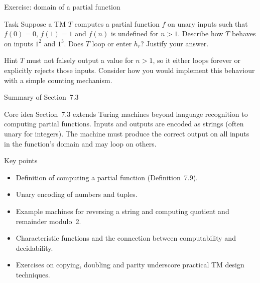 \begin{frame}[t]{Exercise: domain of a partial function}
  \begin{tblock}{Task}
    Suppose a TM $T$ computes a partial function $f$ on unary inputs
    such that $f(0)=0$, $f(1)=1$ and $f(n)$ is undefined for $n>1$.
    Describe how $T$ behaves on inputs $1^2$ and $1^3$.  Does $T$ loop
    or enter $h_r$?  Justify your answer.
  \end{tblock}
  \begin{talert}{Hint}
    $T$ must not falsely output a value for $n>1$, so it either loops
    forever or explicitly rejects those inputs.  Consider how you
    would implement this behaviour with a simple counting mechanism.
  \end{talert}
  \label{fr:7.3-14}
\end{frame}

\begin{frame}[t]{Summary of Section 7.3}
  \begin{tblock}{Core idea}
    Section 7.3 extends Turing machines beyond language recognition to
    computing partial functions.  Inputs and outputs are encoded as
    strings (often unary for integers).  The machine must produce the
    correct output on all inputs in the function’s domain and may
    loop on others.
  \end{tblock}
  \begin{tblock}{Key points}
    \begin{itemize}
      \item Definition of computing a partial function (Definition 7.9).
      \item Unary encoding of numbers and tuples.
      \item Example machines for reversing a string and computing
        quotient and remainder modulo 2.
      \item Characteristic functions and the connection between
        computability and decidability.
      \item Exercises on copying, doubling and parity underscore
        practical TM design techniques.
    \end{itemize}
  \end{tblock}
  \label{fr:7.3-15}
\end{frame}

